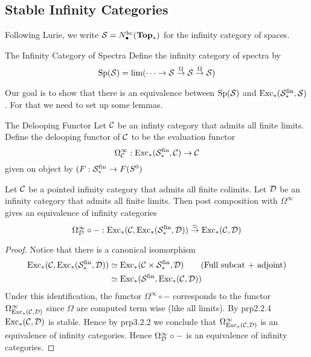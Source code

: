 \documentclass[a4paper]{article}
\begin{document}
\subsection{Stable Infinity Categories}
Following Lurie, we write $\mathcal{S}=N_\bullet^{\text{hc}}(\bold{Top}_\ast)$ for the infinity category of spaces. 

\begin{defn}{The Infinity Category of Spectra}{} Define the infinity category of spectra by $$\text{Sp}(\mathcal{S})=\lim(\cdots\rightarrow\mathcal{S}\overset{\Omega}{\rightarrow}\mathcal{S}\overset{\Omega}{\rightarrow}\mathcal{S})$$
\end{defn}

Our goal is to show that there is an equivalence between $\text{Sp}(\mathcal{S})$ and $\text{Exc}_\ast(\mathcal{S}_\ast^\text{fin},\mathcal{S})$. For that we need to set up some lemmas. 

\begin{defn}{The Delooping Functor}{} Let $\mathcal{C}$ be an infinty category that admits all finite limits. Define the delooping functor of $\mathcal{C}$ to be the evaluation functor $$\Omega_{\mathcal{C}}^\infty:\text{Exc}_\ast(\mathcal{S}_\ast^\text{fin},\mathcal{C})\to\mathcal{C}$$ given on object by $(F:\mathcal{S}_\ast^\text{fin}\to F(S^0)$
\end{defn}

\begin{prp}{}{} Let $\mathcal{C}$ be a pointed infinity category that admits all finite colimits. Let $\mathcal{D}$ be an infinity category that admits all finite limits. Then post composition with $\Omega^\infty$ gives an equivalence of infinity categories $$\Omega_{\mathcal{D}}^\infty\circ-:\text{Exc}_\ast(\mathcal{C},\text{Exc}_\ast(\mathcal{S}_\ast^\text{fin},\mathcal{D}))\overset{\simeq}{\rightarrow}\text{Exc}_\ast(\mathcal{C},\mathcal{D})$$ \tcbline
\begin{proof}
Notice that there is a canonical isomorphism 
\begin{align*}
\text{Exc}_\ast(\mathcal{C},\text{Exc}_\ast(\mathcal{S}_\ast^\text{fin},\mathcal{D}))&\simeq\text{Exc}_\ast(\mathcal{C}\times\mathcal{S}_\ast^\text{fin},\mathcal{D})\tag{Full subcat + adjoint}\\
&\simeq\text{Exc}_\ast(\mathcal{S}^\text{fin},\text{Exc}_\ast(\mathcal{C},\mathcal{D}))
\end{align*}
Under this identification, the functor $\Omega^\infty\circ -$ corresponds to the functor $\Omega_{\text{Exc}_\ast(\mathcal{C},\mathcal{D})}^\infty$ since $\Omega$ are computed term wise (like all limits). By prp2.2.4 $\text{Exc}_\ast(\mathcal{C},\mathcal{D})$ is stable. Hence by prp3.2.2 we conclude that $\Omega_{\text{Exc}_\ast(\mathcal{C},\mathcal{D})}^\infty$ is an equivalence of infinity categories. Hence $\Omega_{\mathcal{D}}^\infty\circ-$ is an equivalence of infinity categories. 
\end{proof}
\end{prp}
\end{document}
